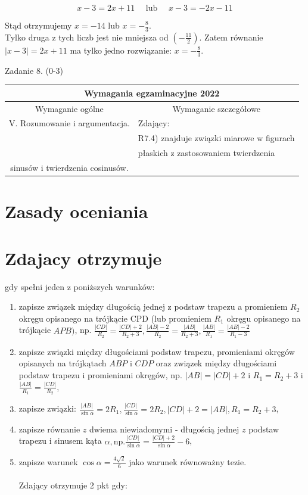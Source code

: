 \documentclass[10pt]{article}
\begin{document}
$$
x-3=2 x+11 \quad \text { lub } \quad x-3=-2 x-11
$$

Stąd otrzymujemy $x=-14$ lub $x=-\frac{8}{3}$.\\
Tylko druga z tych liczb jest nie mniejsza od $\left(-\frac{11}{2}\right)$. Zatem równanie $|x-3|=2 x+11$ ma tylko jedno rozwiązanie: $x=-\frac{8}{3}$.

Zadanie 8. (0-3)

\begin{center}
\begin{tabular}{|c|l|}
\hline
\multicolumn{2}{|c|}{Wymagania egzaminacyjne 2022} \\
\hline
\multicolumn{1}{|c|}{Wymaganie ogólne} & \multicolumn{1}{c|}{Wymaganie szczegółowe} \\
\hline
V. Rozumowanie i argumentacja. & Zdający: \\
 & R7.4) znajduje związki miarowe w figurach \\
 & płaskich z zastosowaniem twierdzenia \\
sinusów i twierdzenia cosinusów. &  \\
\hline
\end{tabular}
\end{center}

\section*{Zasady oceniania}
\section*{Zdajacy otrzymuje}
gdy spełni jeden z poniższych warunków:

\begin{enumerate}
  \item zapisze związek między długością jednej z podstaw trapezu a promieniem $R_{2}$ okręgu opisanego na trójkącie CPD (lub promieniem $R_{1}$ okręgu opisanego na trójkącie $A P B)$, np. $\frac{|C D|}{R_{2}}=\frac{|C D|+2}{R_{2}+3}, \frac{|A B|-2}{R_{2}}=\frac{|A B|}{R_{2}+3}, \frac{|A B|}{R_{1}}=\frac{|A B|-2}{R_{1}-3}$
  \item zapisze związki między długościami podstaw trapezu, promieniami okręgów opisanych na trójkątach $A B P$ i $C D P$ oraz związek między długościami podstaw trapezu i promieniami okręgów, np. $|A B|=|C D|+2$ i $R_{1}=R_{2}+3$ i $\frac{|A B|}{R_{1}}=\frac{|C D|}{R_{2}}$,
  \item zapisze związki: $\frac{|A B|}{\sin \alpha}=2 R_{1}, \frac{|C D|}{\sin \alpha}=2 R_{2},|C D|+2=|A B|, R_{1}=R_{2}+3$,
  \item zapisze równanie $z$ dwiema niewiadomymi - długością jednej $z$ podstaw trapezu i sinusem kąta $\alpha, \mathrm{np} . \frac{|C D|}{\sin \alpha}=\frac{|C D|+2}{\sin \alpha}-6$,
  \item zapisze warunek $\cos \alpha=\frac{4 \sqrt{2}}{6}$ jako warunek równoważny tezie.\\
$\qquad$\\
Zdający otrzymuje 2 pkt gdy:
\end{enumerate}
\end{document}
